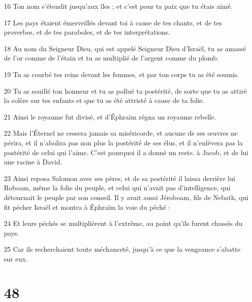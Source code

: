 \par 16 Ton nom s'étendit jusqu'aux îles ; et c'est pour ta paix que tu étais aimé.
\par 17 Les pays étaient émerveillés devant toi à cause de tes chants, et de tes proverbes, et de tes paraboles, et de tes interprétations.
\par 18 Au nom du Seigneur Dieu, qui est appelé Seigneur Dieu d'Israël, tu as amassé de l'or comme de l'étain et tu as multiplié de l'argent comme du plomb.
\par 19 Tu as courbé tes reins devant les femmes, et par ton corps tu as été soumis.
\par 20 Tu as souillé ton honneur et tu as pollué ta postérité, de sorte que tu as attiré la colère sur tes enfants et que tu as été attristé à cause de ta folie.
\par 21 Ainsi le royaume fut divisé, et d'Éphraïm régna un royaume rebelle.
\par 22 Mais l'Éternel ne cessera jamais sa miséricorde, et aucune de ses œuvres ne périra, et il n'abolira pas non plus la postérité de ses élus, et il n'enlèvera pas la postérité de celui qui l'aime. C'est pourquoi il a donné un reste. à Jacob, et de lui une racine à David.
\par 23 Ainsi reposa Salomon avec ses pères, et de sa postérité il laissa derrière lui Roboam, même la folie du peuple, et celui qui n'avait pas d'intelligence, qui détournait le peuple par son conseil. Il y avait aussi Jéroboam, fils de Nebath, qui fit pécher Israël et montra à Éphraïm la voie du péché :
\par 24 Et leurs péchés se multiplièrent à l'extrême, au point qu'ils furent chassés du pays.
\par 25 Car ils recherchaient toute méchanceté, jusqu'à ce que la vengeance s'abatte sur eux.

\chapter{48}

